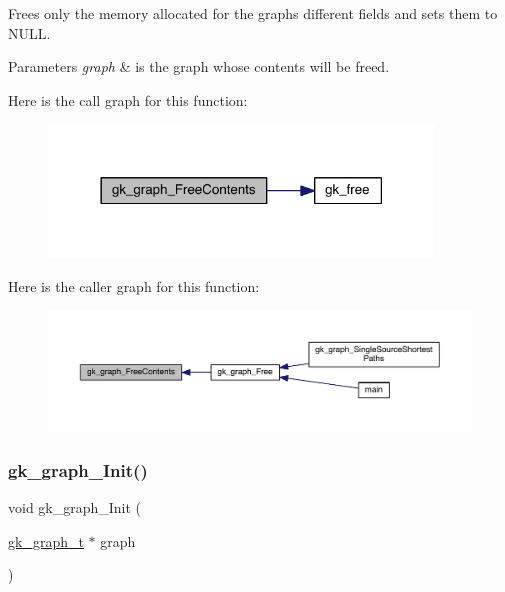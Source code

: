 Frees only the memory allocated for the graph\textquotesingle{}s different fields and sets them to N\+U\+LL. 
\begin{DoxyParams}{Parameters}
{\em graph} & is the graph whose contents will be freed. \\
\hline
\end{DoxyParams}
Here is the call graph for this function\+:\nopagebreak
\begin{figure}[H]
\begin{center}
\leavevmode
\includegraphics[width=290pt]{a00077_a00a7be5e2819fb9444360695e8d047d3_cgraph}
\end{center}
\end{figure}
Here is the caller graph for this function\+:\nopagebreak
\begin{figure}[H]
\begin{center}
\leavevmode
\includegraphics[width=350pt]{a00077_a00a7be5e2819fb9444360695e8d047d3_icgraph}
\end{center}
\end{figure}
\mbox{\label{a00077_ab017e0e6f2436f3ad24ea01d8b2c588c}} 
\subsubsection{\texorpdfstring{gk\+\_\+graph\+\_\+\+Init()}{gk\_graph\_Init()}}
{\footnotesize\ttfamily void gk\+\_\+graph\+\_\+\+Init (\begin{DoxyParamCaption}\item[{\hyperlink{a00638}{gk\+\_\+graph\+\_\+t} $\ast$}]{graph }\end{DoxyParamCaption})}

